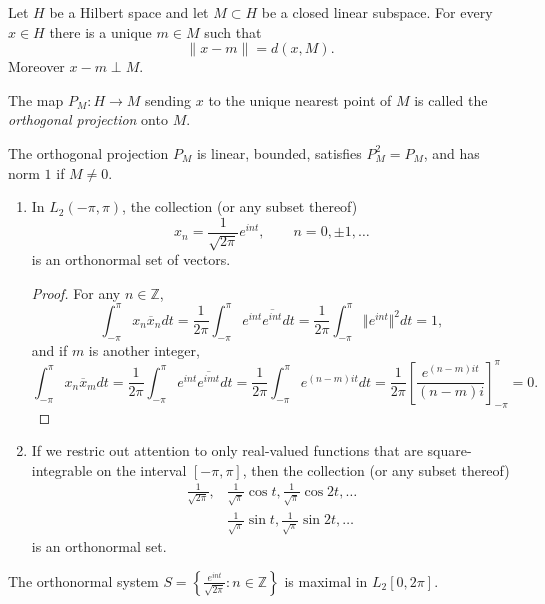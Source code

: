 \begin{theorem}
\label{theorem-projection-hilbert}
Let $H$ be a Hilbert space and let $M\subset
H$ be a closed linear subspace. For every
$x\in H$ there is a unique $m\in M$ such that
$$
\|x-m\|=d(x,M).
$$
Moreover $x-m\perp M$.
\end{theorem}

\begin{definition}
\label{definition-orthogonal-projection}
The map $P_M:H\to M$ sending $x$ to the
unique nearest point of $M$ is called the
{\it orthogonal projection} onto $M$.
\end{definition}

\begin{proposition}
\label{proposition-orthogonal-projection}
The orthogonal projection $P_M$ is linear,
bounded, satisfies $P_M^2=P_M$, and has norm
$1$ if $M\neq0$.
\end{proposition}

\begin{proposition}
\label{example-fourier-orthonormal-system}
\begin{enumerate}
\item In $L_2(-\pi,\pi)$, the collection (or any subset thereof)
\[x_n=\frac{1}{\sqrt{2\pi}}e^{int},\qquad n=0,\pm1,\ldots\]
is an orthonormal set of vectors.
\begin{proof}
For any $n\in\mathbb{Z}$,
\[\int_{-\pi}^\pi x_n\overline{x}_ndt=\frac{1}{2\pi}\int_{-\pi}^\pi e^{int}\overline{e^{int}}dt=\frac{1}{2\pi}\int_{-\pi}^\pi \Vert e^{int}\Vert^2dt=1,\]
and if $m$ is another integer,
\[\int_{-\pi}^\pi x_n\overline{x}_mdt=\frac{1}{2\pi}\int_{-\pi}^\pi e^{int}\overline{e^{imt}}dt=\frac{1}{2\pi}\int_{-\pi}^\pi e^{(n-m)it}dt=\frac{1}{2\pi}\left[\frac{e^{(n-m)it}}{(n-m)i}\right]_{-\pi}^\pi=0.\]
\end{proof}
\item If we restric out attention to only real-valued functions that are square-integrable on the interval $[-\pi,\pi]$, then the collection (or any subset thereof)
\begin{align*}
\frac{1}{\sqrt{2\pi}},&\frac{1}{\sqrt{\pi}}\cos t,\frac{1}{\sqrt{\pi}}\cos 2t,\ldots\\
&\frac{1}{\sqrt{\pi}}\sin t,\frac{1}{\sqrt{\pi}}\sin 2t,\ldots
\end{align*}
is an orthonormal set.
\end{enumerate}
\end{proposition}

\begin{proposition}
\label{proposition-fourier-system-maximal}
The orthonormal system
$
S=
\left\{
\frac{e^{int}}{\sqrt{2\pi}}:n\in\mathbb Z
\right\}
$
is maximal in $L_2[0,2\pi]$.
\end{proposition}

